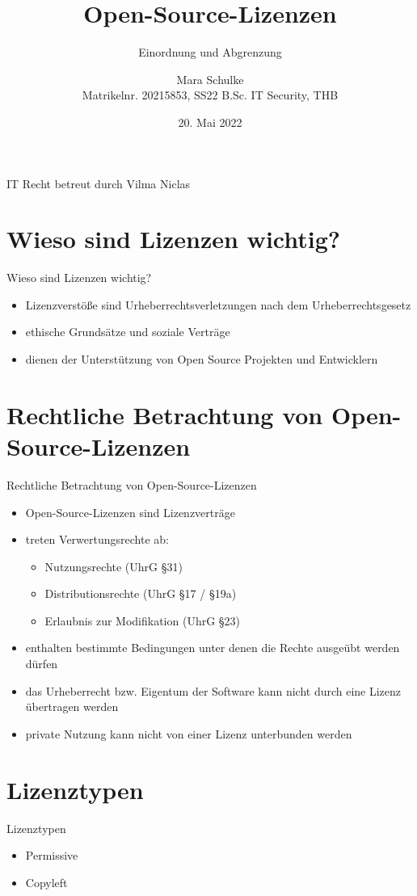 \documentclass{beamer}
\title{Open-Source-Lizenzen}
\subtitle{Einordnung und Abgrenzung}
\author{Mara Schulke\\\tiny{Matrikelnr. 20215853, SS22 B.Sc. IT Security, THB}}
\date{20. Mai 2022}
\begin{document}
\begin{frame}
	IT Recht \hfill betreut durch Vilma Niclas
	\vspace{1em}
	\titlepage
\end{frame}

\section{Wieso sind Lizenzen wichtig?}
\begin{frame}{Wieso sind Lizenzen wichtig?}
	\begin{itemize}
		\item Lizenzverstöße sind Urheberrechtsverletzungen nach dem Urheberrechtsgesetz
		\item ethische Grundsätze und soziale Verträge
		\item dienen der Unterstützung von Open Source Projekten und
			Entwicklern
	\end{itemize}
\end{frame}

\section{Rechtliche Betrachtung von Open-Source-Lizenzen}
\begin{frame}{Rechtliche Betrachtung von Open-Source-Lizenzen}
	\begin{itemize}
		\item Open-Source-Lizenzen sind Lizenzverträge
		\item treten Verwertungsrechte ab:
			\begin{itemize}
				\item Nutzungsrechte (UhrG §31)
				\item Distributionsrechte (UhrG §17 / §19a)
				\item Erlaubnis zur Modifikation (UhrG §23)
			\end{itemize}
		\item enthalten bestimmte Bedingungen unter denen die Rechte ausgeübt
			werden dürfen
		\item das Urheberrecht bzw. Eigentum der Software kann nicht durch eine
			Lizenz übertragen werden
		\item private Nutzung kann nicht von einer Lizenz unterbunden werden
	\end{itemize}
\end{frame}

\section{Lizenztypen}
\begin{frame}{Lizenztypen}
	\begin{itemize}
		\item Permissive
		\item Copyleft
	\end{itemize}
\end{frame}
\end{document}

